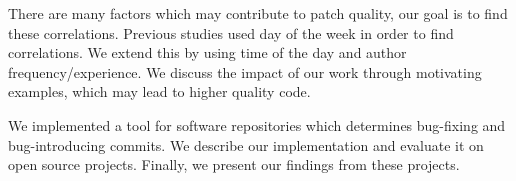 There are many factors which may contribute to patch quality, our goal
is to find these correlations. Previous studies used day of the week
in order to find correlations. We extend this by using time of the day
and author frequency/experience. We discuss the impact of our work
through motivating examples, which may lead to higher quality code.

We implemented a tool for software repositories which determines
bug-fixing and bug-introducing commits. We describe our implementation
and evaluate it on open source projects. Finally, we present our
findings from these projects.

